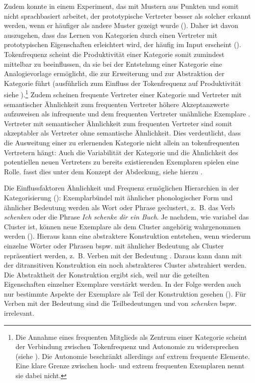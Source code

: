 Zudem konnte in einem Experiment, das mit Mustern aus Punkten und somit nicht sprachbasiert arbeitet, der prototypische Vertreter besser als solcher erkannt werden, wenn er häufiger als andere Muster gezeigt wurde (\cite[87--88]{Goldberg.2006}). Daher ist davon auszugehen, dass das Lernen von Kategorien durch einen Vertreter mit prototypischen Eigenschaften erleichtert wird, der häufig im Input erscheint (\cite[87]{Goldberg.2006}). Tokenfrequenz scheint die Produktivität einer Kategorie somit zumindest mittelbar zu beeinflussen, da sie bei der Entstehung einer Kategorie eine Analogievorlage ermöglicht, die zur Erweiterung und zur Abstraktion der Kategorie führt (ausführlich zum Einfluss der Tokenfrequenz auf Produktivität siehe ).\footnote{Die Annahme eines frequenten Mitglieds als Zentrum einer Kategorie scheint der Verbindung zwischen Tokenfrequenz und Autonomie zu widersprechen (siehe ). Die Autonomie beschränkt \textcite[715]{Bybee.2006b} allerdings auf extrem frequente Elemente. Eine klare Grenze zwischen hoch- und extrem frequenten Exemplaren nennt sie dabei nicht.} Zudem scheinen frequente Vertreter einer Kategorie und Vertreter mit semantischer Ähnlichkeit zum frequenten Vertreter höhere Akzeptanzwerte aufzuweisen als infrequente und dem frequenten Vertreter unähnliche Exemplare \parencites[727--728]{Bybee.2006b}[325--327]{Bybee.2006}. Vertreter mit semantischer Ähnlichkeit zum frequenten Vertreter sind somit akzeptabler als Vertreter ohne semantische Ähnlichkeit. Dies verdeutlicht, dass die Ausweitung einer zu erlernenden Kategorie nicht allein an tokenfrequenten Vertretern hängt: Auch die Variabilität der Kategorie und die Ähnlichkeit des potentiellen neuen Vertreters zu bereits existierenden Exemplaren spielen eine Rolle. \textcite[62--65]{Goldberg.2019} fasst dies unter dem Konzept der Abdeckung, siehe hierzu .

Die Einflussfaktoren Ähnlichkeit und Frequenz ermöglichen Hierarchien in der Kategorisierung (\cite[716]{Bybee.2006b}): Exemplarbündel mit ähnlicher phonologischer Form und ähn\-licher Bedeutung werden als Wort oder Phrase geclustert, z.~B. das Verb \textit{schenken} oder die Phrase \textit{Ich schenke dir ein Buch}. Je nachdem, wie variabel das Cluster ist, können neue Exemplare als dem Cluster angehörig wahrgenommen werden (\cite[62]{Goldberg.2019}). Hieraus kann eine abstraktere Konstruktion entstehen, wenn wiederum einzelne Wörter oder Phrasen bspw. mit ähnlicher Bedeutung als Cluster repräsentiert werden, z.~B. Verben mit der Bedeutung . Daraus kann dann mit der ditransitiven Konstruktion ein noch abstrakteres Cluster abstrahiert werden. Die Abstraktheit der Konstruktion ergibt sich, weil nur die geteilten Eigenschaften einzelner Exem\-plare verstärkt werden. In der Folge werden auch nur bestimmte Aspekte der Exemplare als Teil der Konstruktion gesehen (\cite[65]{Bybee.2013}). Für Verben mit der Bedeutung  sind die Teilbedeutungen  und  von \textit{schenken} bspw. irrelevant. 



